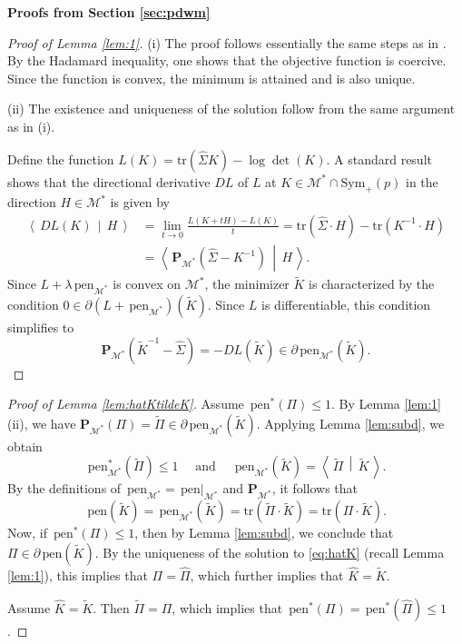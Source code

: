 \documentclass[12pt]{amsart}
\numberwithin{equation}{section}
\numberwithin{equation}{section}
\theoremstyle{definition}
\newcommand{\norm}{\,\mathrm{pen}}
\newcommand{\normd}{\,\mathrm{pen}^\ast}
\newcommand{\norms}{\,\mathrm{pen}_{\mathcal{M}^\ast}}
\newcommand{\normsd}{\,\mathrm{pen}_{\mathcal{M}^\ast}^\ast}
\newcommand{\proj}{\mathrm{\mathbf{P}}_{\mathcal{M}^\ast}}
\newcommand{\Mast}{\mathcal{M}^\ast}
\newcommand{\tr}[1]{\mathrm{tr}\left(#1\right)}
\newcommand{\scalar}[2]{\left\langle\,#1\,\middle|\,#2\,\right\rangle}
\begin{document}
\textbf{Proofs from Section \ref{sec:pdwm}} 


\begin{proof}[Proof of Lemma \ref{lem:1}]
	(i) The proof follows essentially the same steps as in \cite[Lemma 3]{ravikumar2011graphical}. By the Hadamard inequality, one shows that the objective function is coercive. Since the function is convex, the minimum is attained and is also unique.
	
	(ii) The existence and uniqueness of the solution follow from the same argument as in (i).
	
	Define the function $L(K) = \tr{\hat{\Sigma}K}-\log\det(K)$. 
	A standard result shows that the directional derivative $DL$ of $L$ at $K\in\Mast\cap\mathrm{Sym}_+(p)$ in the direction $H\in\Mast$ is given by 
	\begin{align*}
		\scalar{DL(K)}{H} &= \lim_{t\to 0}\frac{L(K+tH)-L(K)}{t}=\tr{\hat{\Sigma}\cdot H}-\tr{K^{-1}\cdot H} \\
		&= \scalar{\proj(\hat{\Sigma}-K^{-1})}{H}.
	\end{align*}
	Since $L+\lambda \norms$ is convex on $\Mast$, the minimizer $\tilde{K}$ is characterized by the condition $0\in \partial (L+\norms)(\tilde{K})$. Since $L$ is differentiable, this condition simplifies to
	\[
	\proj(\tilde{K}^{-1}-\hat{\Sigma})= -DL(\tilde K)\in \partial \norms(\tilde{K}).
	\]
\end{proof}


\begin{proof}[Proof of Lemma \ref{lem:hatKtildeK}]
	Assume $\normd(\Pi)\leq 1$. 
	By Lemma \ref{lem:1} (ii), we have $\proj(\Pi)=\tilde{\Pi}\in \partial \norms(\tilde{K})$. Applying Lemma \ref{lem:subd}, we obtain
	\[
	\normsd(\tilde{\Pi})\leq 1\quad\mbox{ and }\quad  \norms(\tilde{K}) = \scalar{\tilde{\Pi}}{\tilde{K}}.
	\]
	By the definitions of $\norms = \norm\big|_{\Mast}$ and $\proj$, it follows that
	\[
	\norm(\tilde{K}) = \norms(\tilde{K})   =\tr{\tilde{\Pi}\cdot \tilde{K}}=\tr{\Pi\cdot \tilde{K}}.
	\]
	Now, if $\normd(\Pi)\leq 1$, then by Lemma \ref{lem:subd}, we conclude that
	$\Pi\in \partial \norm(\tilde{K})$. By the uniqueness of the solution to \eqref{eq:hatK} (recall Lemma \ref{lem:1}), this implies that  $\Pi=\hat{\Pi}$, which further implies that $\hat{K}=\tilde{K}$.
	
	Assume $\hat{K}=\tilde{K}$. Then $\tilde{\Pi}=\Pi$, which implies that $\normd(\Pi) = \normd(\hat{\Pi})\leq 1$.
\end{proof}
\end{document}
